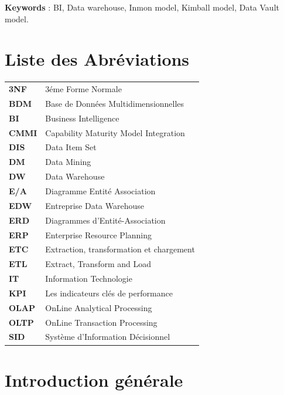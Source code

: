 \documentclass[a4paper,12pt]{report}
\begin{document}
 
\textbf{Keywords} : BI, Data warehouse, Inmon model, Kimball model, Data Vault model.


\newpage
	
	
\tableofcontents
\listoftables
\listoffigures

\newpage

\chapter*{Liste des Abréviations}
\begin{table}[H]
\centering
\begin{tabular}{ll}
\textbf{3NF}  & 3éme Forme Normale                       \\
\textbf{BDM}  & Base de Données Multidimensionnelles     \\
\textbf{BI}   & Business Intelligence                    \\
\textbf{CMMI} & Capability Maturity Model Integration    \\
\textbf{DIS}  & Data Item Set                            \\
\textbf{DM}   & Data Mining                              \\
\textbf{DW}   & Data Warehouse                           \\
\textbf{E/A}  & Diagramme Entité Association             \\
\textbf{EDW}  & Entreprise Data Warehouse                \\
\textbf{ERD}  & Diagrammes d’Entité-Association          \\
\textbf{ERP}  & Enterprise Resource Planning             \\
\textbf{ETC}  & Extraction, transformation et chargement \\
\textbf{ETL}  & Extract, Transform and Load              \\
\textbf{IT}   & Information Technologie                  \\
\textbf{KPI}  & Les indicateurs clés de performance      \\
\textbf{OLAP} & OnLine Analytical Processing             \\
\textbf{OLTP} & OnLine Transaction Processing            \\
\textbf{SID}  & Système d’Information Décisionnel       
\end{tabular}
\end{table}


\newpage
\chapter*{Introduction générale}
\normalsize
{}
\end{document}

